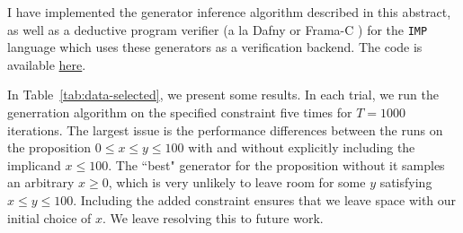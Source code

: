 \documentclass[sigconf,nonacm]{acmart}
\begin{document}
I have implemented the generator inference algorithm described in this abstract,
as well as a deductive program verifier (a la Dafny or Frama-C \cite{dafny,framac}) for the
\texttt{IMP} language which uses these generators as a verification backend.
The code is available \href{https://github.com/jdublu10/triple-testing}{here}.

In Table~\ref{tab:data-selected}, we present some results.
In each trial, we run the generration algorithm on the specified constraint five
times for $T = 1000$ iterations. The largest issue is the performance
differences between the runs on the proposition $0 \leq x \leq y \leq 100$ with
and without explicitly including the implicand $x \leq 100$.
The ``best" generator for the proposition without it samples an
arbitrary $x \geq 0$, which is very unlikely to leave room for some $y$
satisfying $x \leq y \leq 100$. Including the added constraint ensures that we leave space
with our initial choice of $x$. We leave resolving this to future work.


\begin{table}[h]
\label{tab:data-selected}
\centering
{}
\end{table}
\end{document}
